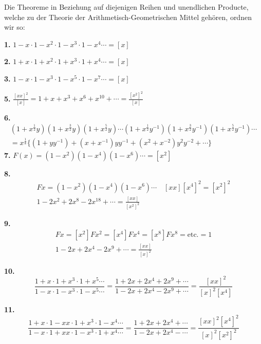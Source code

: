 \documentclass[10pt,a4paper]{article}
\begin{document}
Die Theoreme in Beziehung auf diejenigen Reihen und unendlichen
Producte, welche zu der Theorie der Arithmetisch-Geometrischen Mittel
gehören, ordnen wir so:

\textbf{1.} $1 - x \cdot 1 - x^2 \cdot 1 - x^3 \cdot 1 - x^4 \cdots = [x]$

\textbf{2.} $1 + x \cdot 1 + x^2 \cdot 1 + x^3 \cdot 1 + x^4 \cdots = [x]$

\textbf{3.} $1 - x \cdot 1 - x^3 \cdot 1 - x^5 \cdot 1 - x^7 \cdots = [x]$

\textbf{5.} $\displaystyle\frac{[xx]^2}{[x]} = 1 + x + x^3 + x^6 + x^{10} + \cdots = \frac{[x^2]^2}{[x]}$

\textbf{6.}
\begin{multline*}
(1 + x^{\frac{1}{2}}y)(1 + x^{\frac{3}{2}}y)(1 + x^{\frac{5}{2}}y) \cdots (1 + x^{\frac{1}{2}}y^{-1})(1 + x^{\frac{3}{2}}y^{-1})(1 + x^{\frac{5}{2}}y^{-1}) \cdots \\
= x^{\frac{1}{8}} \bigl\{(1 + yy^{-1}) + (x + x^{-1})yy^{-1} + (x^2 + x^{-2})y^2y^{-2} + \cdots\bigr\}
\end{multline*}
%
\textbf{7.} $F(x) = (1 - x^2)(1 - x^4)(1 - x^6) \cdots = [x^2]$

\textbf{8.}
\begin{gather*}
Fx = (1 - x^2)(1 - x^4)(1 - x^6) \cdots \quad [xx][x^4]^2 = [x^2]^2 \\
1 - 2x^2 + 2x^8 - 2x^{18} + \cdots = \frac{[xx]}{[x^2]^2}
\end{gather*}

\textbf{9.}
\begin{gather*}
[xx]Fx = [x^2]Fx^2 = [x^4]Fx^4 = [x^8]Fx^8 = \text{etc.} = 1 \\
1 - 2x + 2x^4 - 2x^9 + \cdots = \frac{[xx]}{[x]^2}
\end{gather*}

\textbf{10.}
\begin{equation*}
\frac{1 + x \cdot 1 + x^3 \cdot 1 + x^5 \cdots}{1 - x \cdot 1 - x^3 \cdot 1 - x^5 \cdots} =
\frac{1 + 2x + 2x^4 + 2x^9 + \cdots}{1 - 2x + 2x^4 - 2x^9 + \cdots} =
\frac{[xx]^2}{[x]^2 [x^4]}
\end{equation*}

\textbf{11.}
\begin{equation*}
\frac{1 + x \cdot 1 - xx \cdot 1 + x^3 \cdot 1 - x^4 \cdots}{1 - x \cdot 1 + xx \cdot 1 - x^3 \cdot 1 + x^4 \cdots} =
\frac{1 + 2x + 2x^4 + \cdots}{1 - 2x + 2x^4 - \cdots} =
\frac{[xx]^2 [x^4]^2}{[x]^2 [x^2]^2}
\end{equation*}
\end{document}
